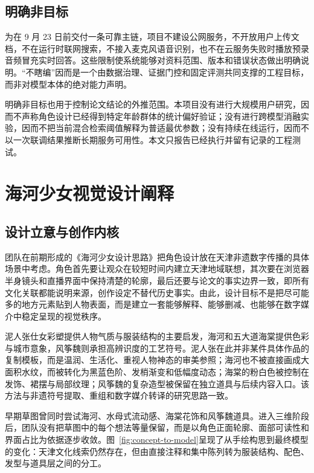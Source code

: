 \documentclass[UTF8,zihao=-4,fontset=none,twoside]{ctexart}
\begin{document}
\subsection{明确非目标}

为在 9 月 23 日前交付一条可靠主链，项目不建设公网服务，不开放用户上传文档，不在运行时联网搜索，不接入麦克风语音识别，也不在云服务失败时播放预录音频冒充实时回答。这些限制使系统能够对资料范围、版本和错误状态做出明确说明。“不瞎编”因而是一个由数据治理、证据门控和固定评测共同支撑的工程目标，而非对模型本体的绝对能力声明。

明确非目标也用于控制论文结论的外推范围。本项目没有进行大规模用户研究，因而不声称角色设计已经得到特定年龄群体的统计偏好验证；没有进行跨模型消融实验，因而不把当前混合检索阈值解释为普适最优参数；没有持续在线运行，因而不以一次联调结果推断长期服务可用性。本文只报告已经执行并留有记录的工程测试。

\clearpage
\section{海河少女视觉设计阐释}

\subsection{设计立意与创作内核}

团队在前期形成的《海河少女设计思路》把角色设计放在天津非遗数字传播的具体场景中考虑。角色首先要让观众在较短时间内建立天津地域联想，其次要在浏览器半身镜头和直播界面中保持清楚的轮廓，最后还要与论文的事实边界一致，即所有文化关联都能说明来源，创作设定不替代历史事实。由此，设计目标不是把尽可能多的地方元素贴到人物表面，而是建立一套能够解释、能够删减、也能够在数字媒介中稳定呈现的视觉秩序。

泥人张仕女彩塑提供人物气质与服装结构的主要启发，海河和五大道海棠提供色彩与城市意象，风筝魏则承担高辨识度的工艺符号。泥人张在此并非某件具体作品的复制模板，而是温润、生活化、重视人物神态的审美参照；海河也不被直接画成大面积水纹，而被转化为黑蓝色阶、发梢渐变和低幅度动态；海棠的粉白色被控制在发饰、裙摆与局部纹理；风筝魏的复杂造型被保留在独立道具与后续内容入口。该方法与非遗符号提取、重组和数字媒介转译的研究思路一致\cite{yuan2026symbol,shao2025kite,jiang2024kite}。

早期草图曾同时尝试海河、水母式流动感、海棠花饰和风筝魏道具。进入三维阶段后，团队没有把草图中的每个想法等量保留，而是以角色正面轮廓、面部可读性和界面占比为依据逐步收敛。图~\ref{fig:concept-to-model}呈现了从手绘构思到最终模型的变化：天津文化线索仍然存在，但由直接注释和集中陈列转为服装结构、配色、发型与道具层之间的分工。
\end{document}
